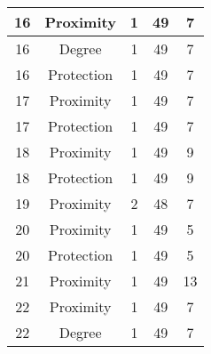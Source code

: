 \documentclass[results.tex]{subfiles}
\begin{document}
\begin{center}
\begin{tabular}{| c || c | c | c | c |}
            \hline
            16                      & Proximity                    & 1                      & 49                      & 7                    \\
            \hline
            16                      & Degree                       & 1                      & 49                      & 7                    \\
            \hline
            16                      & Protection                   & 1                      & 49                      & 7                    \\
            \hline
            17                      & Proximity                    & 1                      & 49                      & 7                    \\
            \hline
            17                      & Protection                   & 1                      & 49                      & 7                    \\
            \hline
            18                      & Proximity                    & 1                      & 49                      & 9                    \\
            \hline
            18                      & Protection                   & 1                      & 49                      & 9                    \\
            \hline
            19                      & Proximity                    & 2                      & 48                      & 7                    \\
            \hline
            20                      & Proximity                    & 1                      & 49                      & 5                    \\
            \hline
            20                      & Protection                   & 1                      & 49                      & 5                    \\
            \hline
            21                      & Proximity                    & 1                      & 49                      & 13                   \\
            \hline
            22                      & Proximity                    & 1                      & 49                      & 7                    \\
            \hline
            22                      & Degree                       & 1                      & 49                      & 7                    \\

\end{tabular}
\end{center}
\end{document}
